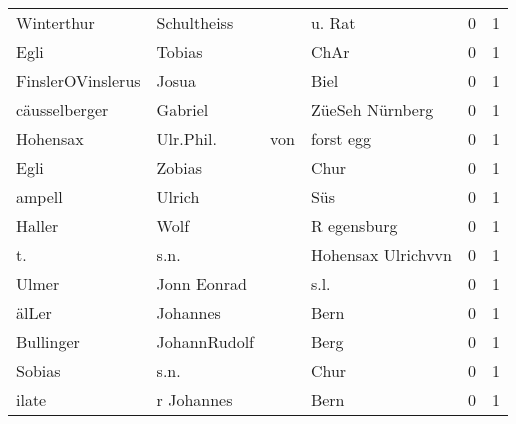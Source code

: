 \begin{center}
\begin{tiny}
\begin{longtabu}{llllrr}
               Winterthur &                        Schultheiss &             &                                      u. Rat &          0 &         1 \\
                     Egli &                             Tobias &             &                                        ChAr &          0 &         1 \\
        FinslerOVinslerus &                              Josua &             &                                        Biel &          0 &         1 \\
            cäusselberger &                            Gabriel &             &                             ZüeSeh Nürnberg &          0 &         1 \\
                 Hohensax &                          Ulr.Phil. &         von &                                   forst egg &          0 &         1 \\
                     Egli &                             Zobias &             &                                        Chur &          0 &         1 \\
                   ampell &                             Ulrich &             &                                         Süs &          0 &         1 \\
                   Haller &                               Wolf &             &                                 R egensburg &          0 &         1 \\
                       t. &                               s.n. &             &                          Hohensax Ulrichvvn &          0 &         1 \\
                    Ulmer &                        Jonn Eonrad &             &                                        s.l. &          0 &         1 \\
                    älLer &                           Johannes &             &                                        Bern &          0 &         1 \\
                Bullinger &                       JohannRudolf &             &                                        Berg &          0 &         1 \\
                   Sobias &                               s.n. &             &                                        Chur &          0 &         1 \\
                    ilate &                         r Johannes &             &                                        Bern &          0 &         1 \\

\end{longtabu}
\end{tiny}
\end{center}
